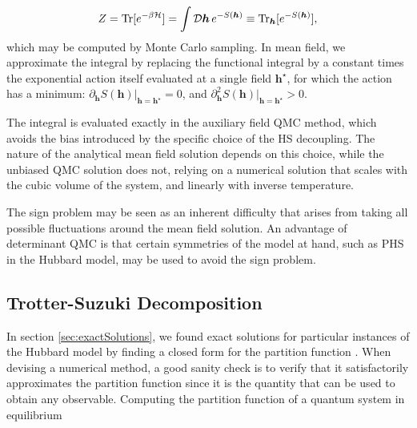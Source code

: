 \begin{equation}
Z = \operatorname{Tr} [ e^{-\beta \mathcal{H} } ] = \int \mathcal{D}\bm h \, e^{-S(\bm h) }  \equiv \operatorname{Tr}_{\bm h} [ e^{-S(\bm h)} ],
\end{equation}
which may be computed by Monte Carlo sampling.
In mean field, we approximate the integral by replacing the functional integral by a constant times the exponential action itself evaluated at a single field $\bm h^\star$, for which the action has a minimum: $\partial_{\bm h} S( \bm h ) |_{\bm h = \bm h^\star} = 0$, and $\partial_{\bm h}^2 S( \bm h ) |_{\bm h = \bm h^\star} > 0$.

The integral is evaluated exactly in the auxiliary field \acs{QMC} method, which avoids the bias introduced by the specific choice of the HS decoupling.
The nature of the analytical mean field solution depends on this choice, while the unbiased \acs{QMC} solution does not, relying on a numerical solution that scales with the cubic volume of the system, and linearly with inverse temperature.

The sign problem may be seen as an inherent difficulty that arises from taking all possible fluctuations around the mean field solution.
An advantage of determinant \acs{QMC} is that certain symmetries of the model at hand, such as \acs{PHS} in the Hubbard model, may be used to avoid the sign problem.

\subsection{Trotter-Suzuki Decomposition}
\label{subsec:trotter}

In section \ref{sec:exactSolutions}, we found exact solutions for particular instances of the Hubbard model by finding a closed form for the partition function \cite{hou_numerical_2009}. When devising a numerical method, a good sanity check is to verify that it satisfactorily approximates the partition function since it is the quantity that can be used to obtain  any observable.
Computing the partition function of a quantum system in equilibrium

